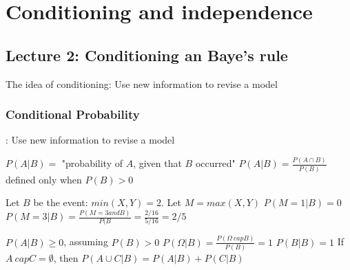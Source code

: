 
\chapter{Conditioning and independence} %

\label{Unit 2} %

\section{Lecture 2: Conditioning an Baye's rule}

The idea of conditioning: Use new information to revise a model
\subsection{Conditional Probability} 

: Use new information to revise a model \\

\begin{outline}
\1 $P(A|B) = $ "probability of $A$, given that $B$ occurred"
\1 $P(A|B) = \frac{P(A \cap B)}{P(B)}$ defined only when $P(B) > 0$
\end{outline}

\begin{outline}
\1 Let $B$ be the event: $min(X,Y)=2$. Let $M=max(X,Y)$
  \2 $P(M=1|B) = 0$
  \2 $P(M=3|B) = \frac{P(M=3 and B)}{P(B}=\frac{2/16}{5/16}=2/5$
\end{outline}

\begin{outline}
\1 $P(A|B) \geq 0$, assuming $P(B) > 0$
\1 $P(\Omega|B) = \frac{P(\Omega \ cap B)}{P(B)} = 1$
\1 $P(B|B) = 1$
\1 If $A \ cap C = \emptyset$, then $P(A \cup C | B) = P(A|B) + P(C|B)$
\end{outline}

